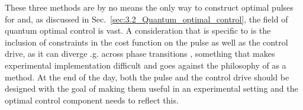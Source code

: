 These three methods are by no means the only way to construct optimal pulses for  and, as discussed in Sec.~\ref{sec:3.2_Quantum_optimal_control}, the field of quantum optimal control is vast. A consideration that is specific to  is the inclusion of constraints in the cost function on the  pulse as well as the control drive, as it can diverge \@e.g. across phase transitions \cite{hatomura_controlling_2021}, something that makes experimental implementation difficult and goes against the philosophy of  as a method. At the end of the day, both the  pulse and the control drive should be designed with the goal of making them useful in an experimental setting and the optimal control component needs to reflect this. 